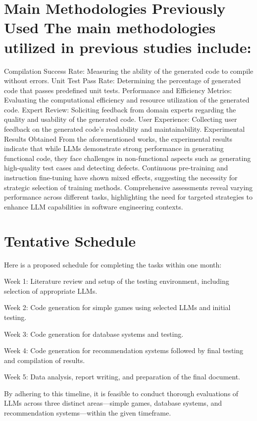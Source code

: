 \documentclass[11pt]{article}
\begin{document}
\section{Main Methodologies Previously Used
The main methodologies utilized in previous studies include:}


Compilation Success Rate: Measuring the ability of the generated code to compile without errors.
Unit Test Pass Rate: Determining the percentage of generated code that passes predefined unit tests.
Performance and Efficiency Metrics: Evaluating the computational efficiency and resource utilization of the generated code.
Expert Review: Soliciting feedback from domain experts regarding the quality and usability of the generated code.
User Experience: Collecting user feedback on the generated code's readability and maintainability.
Experimental Results Obtained
From the aforementioned works, the experimental results indicate that while LLMs demonstrate strong performance in generating functional code, they face challenges in non-functional aspects such as generating high-quality test cases and detecting defects. Continuous pre-training and instruction fine-tuning have shown mixed effects, suggesting the necessity for strategic selection of training methods. Comprehensive assessments reveal varying performance across different tasks, highlighting the need for targeted strategies to enhance LLM capabilities in software engineering contexts.

\section{Tentative Schedule}

Here is a proposed schedule for completing the tasks within one month:


Week 1: Literature review and setup of the testing environment, including selection of appropriate LLMs.

Week 2: Code generation for simple games using selected LLMs and initial testing.

Week 3: Code generation for database systems and testing.

Week 4: Code generation for recommendation systems followed by final testing and compilation of results.

Week 5: Data analysis, report writing, and preparation of the final document.

By adhering to this timeline, it is feasible to conduct thorough evaluations of LLMs across three distinct areas—simple games, database systems, and recommendation systems—within the given timeframe.
\end{document}
